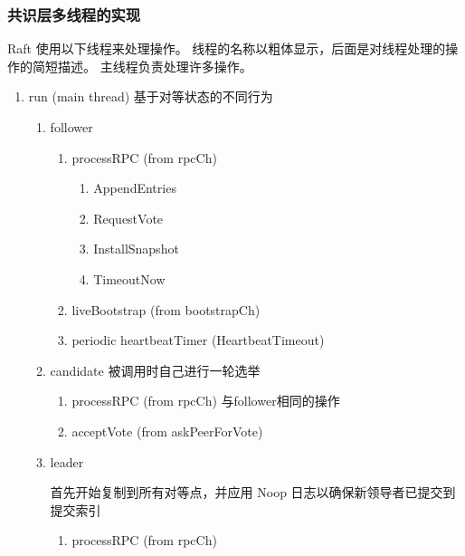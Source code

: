 		\subsubsection{共识层多线程的实现}
		Raft 使用以下线程来处理操作。 线程的名称以粗体显示，后面是对线程处理的操作的简短描述。 主线程负责处理许多操作。
			\begin{enumerate}
				\item run (main thread)
				基于对等状态的不同行为
				
				\begin{enumerate}
					
					\item follower
					\begin{enumerate}
					\item processRPC (from rpcCh)
						\begin{enumerate}
						
							\item AppendEntries
							
							\item RequestVote
							
							\item InstallSnapshot
							
							\item TimeoutNow
						
						\end{enumerate}
					\item liveBootstrap (from bootstrapCh)
					\item periodic heartbeatTimer (HeartbeatTimeout)
					\end{enumerate}
					\item candidate
						被调用时自己进行一轮选举
					
					\begin{enumerate}
					
						\item processRPC (from rpcCh)
							与follower相同的操作

						\item acceptVote (from askPeerForVote)
					
					\end{enumerate}
					
					\item leader 
						
					首先开始复制到所有对等点，并应用 Noop 日志以确保新领导者已提交到提交索引
						\begin{enumerate}
						\item processRPC (from rpcCh)	
							

\end{enumerate}
\end{enumerate}
\end{enumerate}
